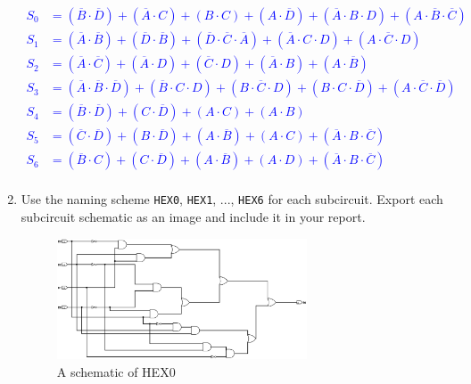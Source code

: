\documentclass{article}
\begin{document}
\begin{enumerate}
\textcolor{blue}{
\begin{align*}
    S_0 &= (\overline{B} \cdot \overline{D}) + (\overline{A} \cdot C) + (B \cdot C) + (A \cdot \overline{D}) + (\overline{A} \cdot B \cdot D) + (A \cdot \overline{B} \cdot \overline{C})   \\
    S_1 &= (\overline{A} \cdot \overline{B}) + (\overline{D} \cdot \overline{B}) + 
    (\overline{D} \cdot \overline{C} \cdot \overline{A}) + (\overline{A} \cdot C \cdot D) + (A \cdot \overline{C} \cdot D) \\
    S_2 &= (\overline{A} \cdot \overline{C}) + (\overline{A} \cdot D) + (\overline{C} \cdot D) + (\overline{A} \cdot B) + (A \cdot \overline{B}) \\
    S_3 &= (\overline{A} \cdot \overline{B} \cdot \overline{D}) + (\overline{B} \cdot C \cdot D) + (B \cdot \overline{C} \cdot D) + (B \cdot C \cdot \overline{D}) + (A \cdot \overline{C} \cdot \overline{D})  \\
    S_4 &= (\overline{B} \cdot \overline{D}) + (C \cdot \overline{D}) + (A \cdot C) + (A \cdot B) \\
    S_5 &= (\overline{C} \cdot \overline{D}) + (B \cdot \overline{D}) + (A \cdot \overline{B}) + (A \cdot C) + (\overline{A} \cdot B  \cdot \overline{C}) \\
    S_6 &= (\overline{B} \cdot C) + (C \cdot \overline{D}) + (A \cdot \overline{B}) + (A \cdot D) + (\overline{A} \cdot B \cdot \overline{C}) \\
\end{align*}}


\item Use the naming scheme \verb|HEX0|, \verb|HEX1|, ..., \verb|HEX6| for each subcircuit.
    Export each subcircuit schematic as an image and include it in your report.

\begin{figure}[ht!]
    \centering
    \includegraphics[width=0.7\textwidth]{part2_hex0.png}
    \caption{A schematic of HEX0}
    \label{f:part2_hex0}
\end{figure}


\end{enumerate}
\end{document}

